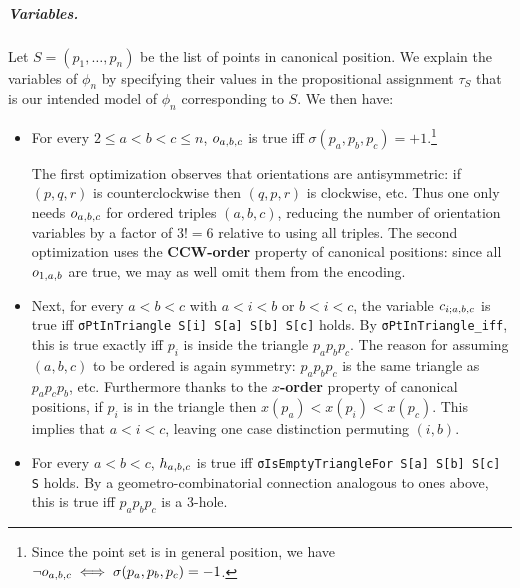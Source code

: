 \subparagraph*{Variables.}
Let $S = (p_1, \ldots, p_n)$ be the list of points in canonical position.
We explain the variables of $\phi_n$
by specifying their values in the propositional assignment $\tau_S$
that is our intended model of $\phi_n$
corresponding to $S$. We then have:
\begin{itemize}
  \item
    For every $2 \leq a < b < c \leq n$, $\orvar_{a,b,c}$ is true
    iff $\sigma(p_a,p_b,p_c) = +1$.\footnote{
    Since the point set is in general position,
    we have $\neg \orvar_{a,b,c} \iff \sigma(p_a, p_b, p_c) = -1$.}

    The first optimization observes that orientations are antisymmetric:
    if $(p,q,r)$ is counterclockwise then $(q,p,r)$ is clockwise, etc.
    Thus one only needs $\orvar_{a,b,c}$ for ordered triples $(a,b,c)$,
    reducing the number of orientation variables by a factor of $3! = 6$
    relative to using all triples. The second optimization uses the \textbf{CCW-order} property of canonical positions:
    since all $\orvar_{1,a,b}$ are true, we may as well omit them from the encoding.

  \item
    Next, for every $a < b < c$ with $a < i < b$ or $b < i < c$,
    the variable $\cvar_{i;a,b,c}$ is true
    iff \lstinline|σPtInTriangle S[i] S[a] S[b] S[c]| holds.
    By \lstinline|σPtInTriangle_iff|, this is true exactly
    iff $p_i$ is inside the triangle $p_ap_bp_c$.
    The reason for assuming $(a,b,c)$ to be ordered is again symmetry:
    $p_ap_bp_c$ is the same triangle as $p_ap_cp_b$, etc.
    Furthermore thanks to the \textbf{$x$-order} property of canonical positions,
    if $p_i$ is in the triangle
    then $x(p_a) < x(p_i) < x(p_c)$.
    This implies that $a < i < c$,
    leaving one case distinction permuting $(i,b)$.

  \item
    For every $a < b < c$,
    $\hvar_{a,b,c}$ is true
    iff \lstinline|σIsEmptyTriangleFor S[a] S[b] S[c] S| holds. 
    By a geometro-combinatorial connection analogous to ones above,
    this is true iff $p_ap_bp_c$ is a $3$-hole.


\end{itemize}
